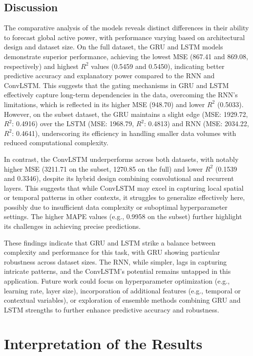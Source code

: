 	\subsection{Discussion}
	
	The comparative analysis of the models reveals distinct differences in their ability to forecast global active power, with performance varying based on architectural design and dataset size. On the full dataset, the GRU and LSTM models demonstrate superior performance, achieving the lowest MSE (867.41 and 869.08, respectively) and highest $R^2$ values (0.5459 and 0.5450), indicating better predictive accuracy and explanatory power compared to the RNN and ConvLSTM. This suggests that the gating mechanisms in GRU and LSTM effectively capture long-term dependencies in the data, overcoming the RNN’s limitations, which is reflected in its higher MSE (948.70) and lower $R^2$ (0.5033). However, on the subset dataset, the GRU maintains a slight edge (MSE: 1929.72, $R^2$: 0.4916) over the LSTM (MSE: 1968.79, $R^2$: 0.4813) and RNN (MSE: 2034.22, $R^2$: 0.4641), underscoring its efficiency in handling smaller data volumes with reduced computational complexity.
	
	In contrast, the ConvLSTM underperforms across both datasets, with notably higher MSE (3211.71 on the subset, 1270.85 on the full) and lower $R^2$ (0.1539 and 0.3346), despite its hybrid design combining convolutional and recurrent layers. This suggests that while ConvLSTM may excel in capturing local spatial or temporal patterns in other contexts, it struggles to generalize effectively here, possibly due to insufficient data complexity or suboptimal hyperparameter settings. The higher MAPE values (e.g., 0.9958 on the subset) further highlight its challenges in achieving precise predictions.
	
	These findings indicate that GRU and LSTM strike a balance between complexity and performance for this task, with GRU showing particular robustness across dataset sizes. The RNN, while simpler, lags in capturing intricate patterns, and the ConvLSTM’s potential remains untapped in this application. Future work could focus on hyperparameter optimization (e.g., learning rate, layer size), incorporation of additional features (e.g., temporal or contextual variables), or exploration of ensemble methods combining GRU and LSTM strengths to further enhance predictive accuracy and robustness.
	

\section{Interpretation of the Results}

